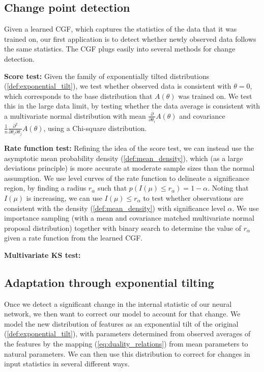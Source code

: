 \documentclass[10pt]{article}      %
\begin{document}
\newpage
\subsection{Change point detection}
Given a learned CGF, which captures the statistics of the data that it was trained on, our first application is to detect whether newly observed data follows the same statistics.
The CGF plugs easily into several methods for change detection.

\noindent \textbf{Score test:} \cite{cox1979theoretical} 
Given the family of exponentially tilted distributions (\ref{def:exponential_tilt}), we test whether observed data is consistent with $\theta = 0$, which corresponds to the base distribution that $A(\theta)$ was trained on.
We test this in the large data limit, by testing whether the data average is consistent with a multivariate normal distribution with mean $\frac{\partial}{\partial \theta_i} A(\theta)$ and covariance $\frac{1}{n}\frac{\partial^2}{\partial \theta_i \partial \theta_j} A(\theta)$, using a Chi-square distribution.

\noindent \textbf{Rate function test:} Refining the idea of the score test, we can instead use the asymptotic mean probability density (\ref{def:mean_density}), which (as a large deviations principle) is more accurate at moderate sample sizes than the normal assumption.
We use level curves of the rate function to delineate a significance region, by finding a radius $r_\alpha$ such that $p(I(\mu) \le r_\alpha) = 1 - \alpha$.
Noting that $I(\mu)$ is increasing, we can use $I(\mu) \le r_\alpha$ to test whether observations are consistent with the density (\ref{def:mean_density}) with significance level $\alpha$.
We use importance sampling (with a mean and covariance matched multivariate normal proposal distribution) together with binary search to determine the value of $r_\alpha$ given a rate function from the learned CGF.


\noindent \textbf{Multivariate KS test:}








\newpage
\subsection{Adaptation through exponential tilting}
Once we detect a significant change in the internal statistic of our neural network, we then want to correct our model to account for that change.
We model the new distribution of features as an exponential tilt of the original (\ref{def:exponential_tilt}), with parameters determined from observed averages of the features by the mapping (\ref{eq:duality_relations}) from mean parameters to natural parameters.
We can then use this distribution to correct for changes in input statistics in several different ways.
\end{document}
